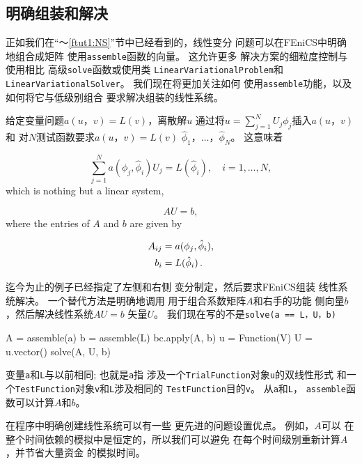 \subsection{明确组装和解决}
\label{ch:poisson0:linalg}


正如我们在“〜\ref{ftut1:NS}”节中已经看到的，线性变分
问题可以在FEniCS中明确地组合成矩阵
使用\texttt{assemble}函数的向量。 这允许更多
解决方案的细粒度控制与使用相比
高级\texttt{solve}函数或使用类
\texttt{LinearVariationalProblem}和
\texttt{LinearVariationalSolver}。 我们现在将更加关注如何
使用\texttt{assemble}功能，以及如何将它与低级别组合
要求解决组装的线性系统。

给定变量问题$a(u，v)=L(v)$，离散解$u$
通过将$u=\sum_{j=1}^N U_j \phi_j$插入$a(u，v)$和
对$N$测试函数要求$a(u，v)=L(v)$
$\hat\phi_1，\ldots，\hat\phi_N$。 这意味着

\begin{equation*}
\sum_{j=1}^N a(\phi_j,\hat\phi_i) U_j = L(\hat\phi_i),\quad i=1,\ldots,N,
\end{equation*}
which is nothing but a linear system,

\begin{equation*}
  AU = b,
\end{equation*}
where the entries of $A$ and $b$ are given by

\begin{align*}
  A_{ij} &= a(\phi_j, \hat{\phi}_i), \\
  b_i &= L(\hat\phi_i)\tp
\end{align*}


迄今为止的例子已经指定了左侧和右侧
变分制定，然后要求FEniCS组装
线性系统解决。 一个替代方法是明确地调用
用于组合系数矩阵$ A $和右手的功能
侧向量$b$，然后解决线性系统$AU=b$
矢量$U$。 我们现在写的不是\texttt{solve(a == L，U，b)}

\begin{python}
A = assemble(a)
b = assemble(L)
bc.apply(A, b)
u = Function(V)
U = u.vector()
solve(A, U, b)
\end{python}
变量\texttt{a}和\texttt{L}与以前相同; 也就是\texttt{a}指
涉及一个\texttt{TrialFunction}对象\texttt{u}的双线性形式
和一个\texttt{TestFunction}对象\texttt{v}和\texttt{L}涉及相同的
\texttt{TestFunction}目的\texttt{v}。 从\texttt{a}和\texttt{L}，
\texttt{assemble}函数可以计算$A$和$b$。

在程序中明确创建线性系统可以有一些
更先进的问题设置优点。 例如，$A$可以
在整个时间依赖的模拟中是恒定的，所以我们可以避免
在每个时间级别重新计算$A$，并节省大量资金
的模拟时间。

